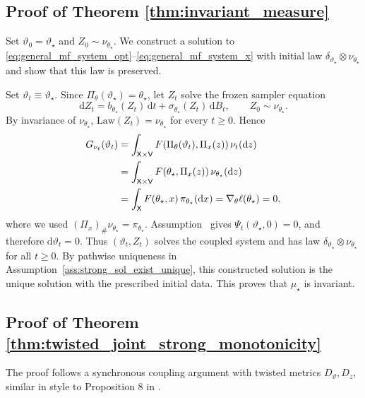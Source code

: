 \subsection{Proof of Theorem \ref{thm:invariant_measure}}\label{app:thm_invariant_measure}
Set \(\vartheta_0=\vartheta_\star\) and \(Z_0\sim\nu_{\theta_\star}\). We construct a solution to \eqref{eq:general_mf_system_opt}--\eqref{eq:general_mf_system_x} with initial law \(\delta_{\vartheta_\star}\otimes\nu_{\theta_\star}\) and show that this law is preserved.

Set \(\vartheta_t\equiv\vartheta_\star\). Since \(\Pi_\theta(\vartheta_\star)=\theta_\star\), let \(Z_t\) solve the frozen sampler equation
\[
    \mathrm dZ_t
    =
    b_{\theta_\star}(Z_t)\,\mathrm dt
    +
    \sigma_{\theta_\star}(Z_t)\,\mathrm dB_t,
    \qquad
    Z_0\sim\nu_{\theta_\star}.
\]
By invariance of \(\nu_{\theta_\star}\), \(\mathrm{Law}(Z_t)=\nu_{\theta_\star}\) for every \(t\ge0\). Hence
\begin{align*}
G_{\nu_t}(\vartheta_t)
&=
\int_{{\mathsf{X}}\times{\mathsf{V}}}
F(\Pi_\theta(\vartheta_t),\Pi_x(z))\,\nu_t(\mathrm dz)\\
&=
\int_{{\mathsf{X}}\times{\mathsf{V}}}
F(\theta_\star,\Pi_x(z))\,\nu_{\theta_\star}(\mathrm dz)\\
&=
\int_{{\mathsf{X}}}F(\theta_\star,x)\,\pi_{\theta_\star}(\mathrm dx)
=
\nabla_\theta\ell(\theta_\star)
=0,
\end{align*}
where we used \((\Pi_x)_\#\nu_{\theta_\star}=\pi_{\theta_\star}\). Assumption~ gives \(\Psi_t(\vartheta_\star,0)=0\), and therefore \(\mathrm d\vartheta_t=0\). Thus \((\vartheta_t,Z_t)\) solves the coupled system and has law \(\delta_{\vartheta_\star}\otimes\nu_{\theta_\star}\) for all \(t\ge0\). By pathwise uniqueness in Assumption~\ref{ass:strong_sol_exist_unique}, this constructed solution is the unique solution with the prescribed initial data. This proves that \(\mu_\star\) is invariant.

\subsection{Proof of Theorem \ref{thm:twisted_joint_strong_monotonicity}}\label{app:thm_joint_strong_monotonicity}

The proof follows a synchronous coupling argument with twisted metrics $D_\vartheta,D_z$, similar in style to Proposition 8 in \citet{theorem2literature_bolley_guillin_malrieu}.


